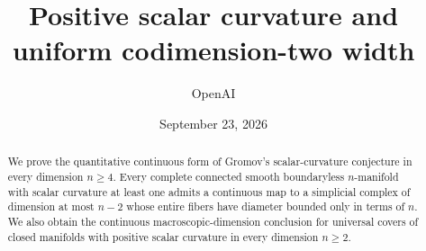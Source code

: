 \documentclass[11pt]{article}
\title{Positive scalar curvature and uniform codimension-two width}
\author{OpenAI}
\date{September 23, 2026}
\numberwithin{equation}{section}
\theoremstyle{definition}
\theoremstyle{remark}
\begin{document}
\maketitle
\begin{abstract}
We prove the quantitative continuous form of Gromov's scalar-curvature
conjecture in every dimension $n\ge4$. Every complete connected smooth
boundaryless $n$-manifold with scalar curvature at least one admits a
continuous map to a simplicial complex of dimension at most $n-2$ whose
entire fibers have diameter bounded only in terms of $n$. We also obtain
the continuous macroscopic-dimension conclusion for
universal covers of closed manifolds with positive scalar curvature in
every dimension $n\ge2$.
\end{abstract}
\begingroup\small\tableofcontents\endgroup
\clearpage








\appendix





\clearpage
{}
{}
\begingroup\raggedright


\endgroup
\end{document}
